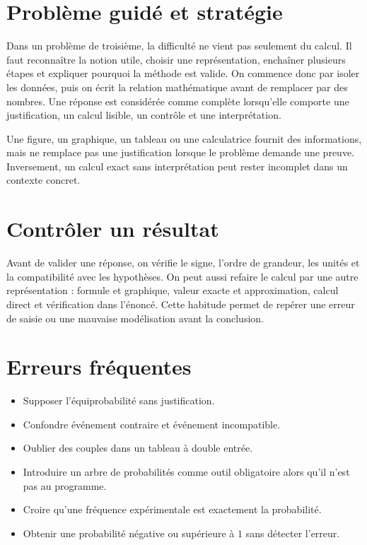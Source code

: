 \section{Problème guidé et stratégie}
Dans un problème de troisième, la difficulté ne vient pas seulement du calcul. Il faut reconnaître la notion utile, choisir une représentation, enchaîner plusieurs étapes et expliquer pourquoi la méthode est valide. On commence donc par isoler les données, puis on écrit la relation mathématique avant de remplacer par des nombres. Une réponse est considérée comme complète lorsqu’elle comporte une justification, un calcul lisible, un contrôle et une interprétation.

\begin{attention}
Une figure, un graphique, un tableau ou une calculatrice fournit des informations, mais ne remplace pas une justification lorsque le problème demande une preuve. Inversement, un calcul exact sans interprétation peut rester incomplet dans un contexte concret.
\end{attention}

\section{Contrôler un résultat}
Avant de valider une réponse, on vérifie le signe, l’ordre de grandeur, les unités et la compatibilité avec les hypothèses. On peut aussi refaire le calcul par une autre représentation : formule et graphique, valeur exacte et approximation, calcul direct et vérification dans l’énoncé. Cette habitude permet de repérer une erreur de saisie ou une mauvaise modélisation avant la conclusion.

\section{Erreurs fréquentes}
\begin{itemize}
\item Supposer l’équiprobabilité sans justification.
\item Confondre événement contraire et événement incompatible.
\item Oublier des couples dans un tableau à double entrée.
\item Introduire un arbre de probabilités comme outil obligatoire alors qu’il n’est pas au programme.
\item Croire qu’une fréquence expérimentale est exactement la probabilité.
\item Obtenir une probabilité négative ou supérieure à $1$ sans détecter l’erreur.
\end{itemize}

